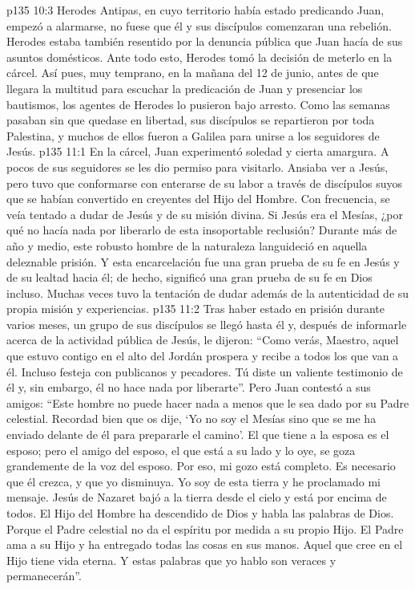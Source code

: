 \vs p135 10:3 Herodes Antipas, en cuyo territorio había estado predicando Juan, empezó a alarmarse, no fuese que él y sus discípulos comenzaran una rebelión. Herodes estaba también resentido por la denuncia pública que Juan hacía de sus asuntos domésticos. Ante todo esto, Herodes tomó la decisión de meterlo en la cárcel. Así pues, muy temprano, en la mañana del 12 de junio, antes de que llegara la multitud para escuchar la predicación de Juan y presenciar los bautismos, los agentes de Herodes lo pusieron bajo arresto. Como las semanas pasaban sin que quedase en libertad, sus discípulos se repartieron por toda Palestina, y muchos de ellos fueron a Galilea para unirse a los seguidores de Jesús.
\vs p135 11:1 En la cárcel, Juan experimentó soledad y cierta amargura. A pocos de sus seguidores se les dio permiso para visitarlo. Ansiaba ver a Jesús, pero tuvo que conformarse con enterarse de su labor a través de discípulos suyos que se habían convertido en creyentes del Hijo del Hombre. Con frecuencia, se veía tentado a dudar de Jesús y de su misión divina. Si Jesús era el Mesías, ¿por qué no hacía nada por liberarlo de esta insoportable reclusión? Durante más de año y medio, este robusto hombre de la naturaleza languideció en aquella deleznable prisión. Y esta encarcelación fue una gran prueba de su fe en Jesús y de su lealtad hacia él; de hecho, significó una gran prueba de su fe en Dios incluso. Muchas veces tuvo la tentación de dudar además de la autenticidad de su propia misión y experiencias.
\vs p135 11:2 \pc Tras haber estado en prisión durante varios meses, un grupo de sus discípulos se llegó hasta él y, después de informarle acerca de la actividad pública de Jesús, le dijeron: “Como verás, Maestro, aquel que estuvo contigo en el alto del Jordán prospera y recibe a todos los que van a él. Incluso festeja con publicanos y pecadores. Tú diste un valiente testimonio de él y, sin embargo, él no hace nada por liberarte”. Pero Juan contestó a sus amigos: “Este hombre no puede hacer nada a menos que le sea dado por su Padre celestial. Recordad bien que os dije, ‘Yo no soy el Mesías sino que se me ha enviado delante de él para prepararle el camino’. El que tiene a la esposa es el esposo; pero el amigo del esposo, el que está a su lado y lo oye, se goza grandemente de la voz del esposo. Por eso, mi gozo está completo. Es necesario que él crezca, y que yo disminuya. Yo soy de esta tierra y he proclamado mi mensaje. Jesús de Nazaret bajó a la tierra desde el cielo y está por encima de todos. El Hijo del Hombre ha descendido de Dios y habla las palabras de Dios. Porque el Padre celestial no da el espíritu por medida a su propio Hijo. El Padre ama a su Hijo y ha entregado todas las cosas en sus manos. Aquel que cree en el Hijo tiene vida eterna. Y estas palabras que yo hablo son veraces y permanecerán”.
